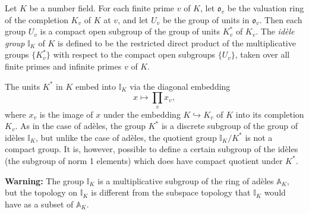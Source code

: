 \documentclass[12pt]{article}
\newcommand{\A}{\mathbb{A}}
\newcommand{\I}{\mathbb{I}}
\renewcommand{\o}{\mathfrak{o}}
\begin{document}
Let $K$ be a number field. For each finite prime $v$ of $K$, let $\o_v$ be the valuation ring of the completion $K_v$ of $K$ at $v$, and let $U_v$ be the group of units in $\o_v$. Then each group $U_v$ is a compact open subgroup of the group of units $K_v^*$ of $K_v$. The {\em id\`ele group} $\I_K$ of $K$ is defined to be the restricted direct product of the multiplicative groups $\{K_v^*\}$ with respect to the compact open subgroups $\{U_v\}$, taken over all finite primes and infinite primes $v$ of $K$.

The units $K^*$ in $K$ embed into $\I_K$ via the diagonal embedding
$$
x \mapsto \prod_v x_v,
$$
where $x_v$ is the image of $x$ under the embedding $K \hookrightarrow K_v$ of $K$ into its completion $K_v$. As in the case of ad\`eles, the group $K^*$ is a discrete subgroup of the group of id\`eles $\I_K$, but unlike the case of ad\`eles, the quotient group $\I_K/K^*$ is not a compact group. It is, however, possible to define a certain subgroup of the id\`eles (the subgroup of norm 1 elements) which does have compact quotient under $K^*$.

{\bf Warning:} The group $\I_K$ is a multiplicative subgroup of the ring of ad\`eles $\A_K$, but the topology on $\I_K$ is different from the subspace topology that $\I_K$ would have as a subset of $\A_K$.
\end{document}
